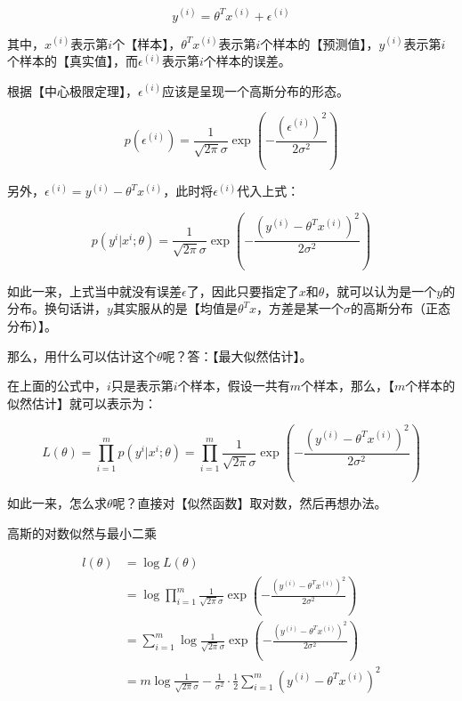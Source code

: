 \documentclass[UTF8]{ctexart}
\begin{document}
\begin{displaymath}
y^{(i)}=\theta^{T}x^{(i)}+\epsilon^{(i)}
\end{displaymath}

其中，$x^{(i)}$表示第$i$个【样本】，$\theta^{T}x^{(i)}$表示第$i$个样本的【预测值】，$y^{(i)}$表示第$i$个样本的【真实值】，而$\epsilon^{(i)}$表示第$i$个样本的误差。

根据【中心极限定理】，$\epsilon^{(i)}$应该是呈现一个高斯分布的形态。

\begin{displaymath}
p(\epsilon^{(i)})=\frac{1}{\sqrt{2\pi}\sigma}\exp(-\frac{(\epsilon^{(i)})^{2}}{2\sigma^{2}})
\end{displaymath}

另外，$\epsilon^{(i)} = y^{(i)} - \theta^{T}x^{(i)}$，此时将$\epsilon^{(i)}$代入上式：

\begin{displaymath}
p(y^{i}|x^{i};\theta)=\frac{1}{\sqrt{2\pi}\sigma}\exp(-\frac{(y^{(i)} - \theta^{T}x^{(i)})^{2}}{2\sigma^{2}})
\end{displaymath}

如此一来，上式当中就没有误差$\epsilon$了，因此只要指定了$x$和$\theta$，就可以认为是一个$y$的分布。换句话讲，$y$其实服从的是【均值是$\theta^{T}x$，方差是某一个$\sigma$的高斯分布（正态分布）】。

那么，用什么可以估计这个$\theta$呢？答：【最大似然估计】。

在上面的公式中，$i$只是表示第$i$个样本，假设一共有$m$个样本，那么，【$m$个样本的似然估计】就可以表示为：

\begin{displaymath}
L(\theta)=\prod_{i=1}^{m}p(y^{i}|x^{i};\theta) = \prod_{i=1}^{m}\frac{1}{\sqrt{2\pi}\sigma}\exp(-\frac{(y^{(i)} - \theta^{T}x^{(i)})^{2}}{2\sigma^{2}})
\end{displaymath}

如此一来，怎么求$\theta$呢？直接对【似然函数】取对数，然后再想办法。

高斯的对数似然与最小二乘


\begin{equation}
\begin{aligned}
l(\theta)&=\log L(\theta)\\
&=\log \prod_{i=1}^{m}\frac{1}{\sqrt{2\pi}\sigma}\exp(-\frac{(y^{(i)} - \theta^{T}x^{(i)})^{2}}{2\sigma^{2}})\\
&=\sum_{i=1}^{m} \log \frac{1}{\sqrt{2\pi}\sigma}\exp(-\frac{(y^{(i)} - \theta^{T}x^{(i)})^{2}}{2\sigma^{2}})\\
&=m\log \frac{1}{\sqrt{2\pi}\sigma} - \frac{1}{\sigma^{2}} \cdot \frac{1}{2} \sum_{i=1}^{m}(y^{(i)} - \theta^{T}x^{(i)})^{2}
\end{aligned}
\end{equation}
\end{document}
